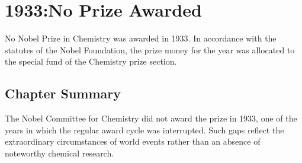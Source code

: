 \chapter{1933:No Prize Awarded}
\label{chap:chemistry1933}

No Nobel Prize in Chemistry was awarded in 1933. In accordance with the statutes of the Nobel Foundation, the prize money for the year was allocated to the special fund of the Chemistry prize section.

\section*{Chapter Summary}

The Nobel Committee for Chemistry did not award the prize in 1933, one of the years in which the regular award cycle was interrupted. Such gaps reflect the extraordinary circumstances of world events rather than an absence of noteworthy chemical research.
